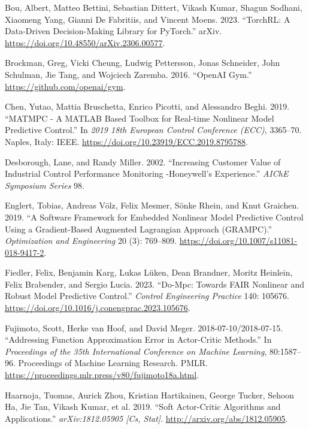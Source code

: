 \documentclass[
  letterpaper,
  DIV=11,
  numbers=noendperiod,
  oneside]{scrartcl}
\newlength{\cslhangindent}
\newenvironment{CSLReferences}[2] %
 {\begin{list}{}{%
  \setlength{\itemindent}{0pt}
  \setlength{\leftmargin}{0pt}
  \setlength{\parsep}{0pt}
  \ifodd #1
   \setlength{\leftmargin}{\cslhangindent}
   \setlength{\itemindent}{-1\cslhangindent}
  \fi
  \setlength{\itemsep}{#2\baselineskip}}}
 {\end{list}}
\begin{document}
\begin{CSLReferences}{1}{0}
Bou, Albert, Matteo Bettini, Sebastian Dittert, Vikash Kumar, Shagun
Sodhani, Xiaomeng Yang, Gianni De Fabritiis, and Vincent Moens. 2023.
{``{TorchRL}: {A} Data-Driven Decision-Making Library for {PyTorch}.''}
arXiv. \url{https://doi.org/10.48550/arXiv.2306.00577}.

Brockman, Greg, Vicki Cheung, Ludwig Pettersson, Jonas Schneider, John
Schulman, Jie Tang, and Wojciech Zaremba. 2016. {``{OpenAI Gym}.''}
\url{https://github.com/openai/gym}.

Chen, Yutao, Mattia Bruschetta, Enrico Picotti, and Alessandro Beghi.
2019. {``{MATMPC} - {A MATLAB Based Toolbox} for {Real-time Nonlinear
Model Predictive Control}.''} In \emph{2019 18th {European Control
Conference} ({ECC})}, 3365--70. Naples, Italy: IEEE.
\url{https://doi.org/10.23919/ECC.2019.8795788}.

Desborough, Lane, and Randy Miller. 2002. {``Increasing {Customer Value}
of {Industrial Control Performance Monitoring} -{Honeywell}'s
{Experience}.''} \emph{AIChE Symposium Series} 98.

Englert, Tobias, Andreas Völz, Felix Mesmer, Sönke Rhein, and Knut
Graichen. 2019. {``A Software Framework for Embedded Nonlinear Model
Predictive Control Using a Gradient-Based Augmented {Lagrangian}
Approach ({GRAMPC}).''} \emph{Optimization and Engineering} 20 (3):
769--809. \url{https://doi.org/10.1007/s11081-018-9417-2}.

Fiedler, Felix, Benjamin Karg, Lukas Lüken, Dean Brandner, Moritz
Heinlein, Felix Brabender, and Sergio Lucia. 2023. {``Do-Mpc: {Towards
FAIR} Nonlinear and Robust Model Predictive Control.''} \emph{Control
Engineering Practice} 140: 105676.
\url{https://doi.org/10.1016/j.conengprac.2023.105676}.

Fujimoto, Scott, Herke van Hoof, and David Meger. 2018-07-10/2018-07-15.
{``Addressing Function Approximation Error in Actor-Critic Methods.''}
In \emph{Proceedings of the 35th International Conference on Machine
Learning}, 80:1587--96. Proceedings of Machine Learning Research. PMLR.
\url{https://proceedings.mlr.press/v80/fujimoto18a.html}.

Haarnoja, Tuomas, Aurick Zhou, Kristian Hartikainen, George Tucker,
Sehoon Ha, Jie Tan, Vikash Kumar, et al. 2019. {``Soft {Actor-Critic
Algorithms} and {Applications}.''} \emph{arXiv:1812.05905 {[}Cs,
Stat{]}}. \url{http://arxiv.org/abs/1812.05905}.


\end{CSLReferences}
\end{document}
